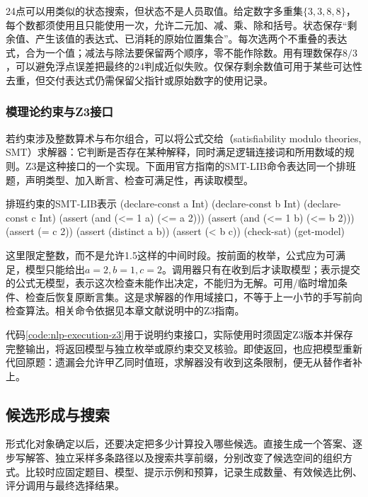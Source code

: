 24点可以用类似的状态搜索，但状态不是人员取值。给定数字多重集$\{3,3,8,8\}$，每个数都须使用且只能使用一次，允许二元加、减、乘、除和括号。状态保存“剩余值、产生该值的表达式、已消耗的原始位置集合”。每次选两个不重叠的表达式，合为一个值；减法与除法要保留两个顺序，零不能作除数。用有理数保存$8/3$，可以避免浮点误差把最终的24判成近似失败。仅保存剩余数值可用于某些可达性去重，但交付表达式仍需保留父指针或原始数字的使用记录。

\subsubsection{模理论约束与Z3接口}
\label{sec:nlp-execution-z3}

若约束涉及整数算术与布尔组合，可以将公式交给（satisfiability modulo theories, SMT）求解器：它判断是否存在某种解释，同时满足逻辑连接词和所用数域的规则。Z3是这种接口的一个实现。下面用官方指南的SMT-LIB命令表达同一个排班题，声明类型、加入断言、检查可满足性，再读取模型。

\begin{codeblock}[label={code:nlp-execution-z3}]{排班约束的SMT-LIB表示}
(declare-const a Int)
(declare-const b Int)
(declare-const c Int)
(assert (and (<= 1 a) (<= a 2)))
(assert (and (<= 1 b) (<= b 2)))
(assert (= c 2))
(assert (distinct a b))
(assert (< b c))
(check-sat)
(get-model)
\end{codeblock}

这里限定整数，而不是允许1.5这样的中间时段。按前面的枚举，公式应为可满足，模型只能给出$a=2,b=1,c=2$。调用器只有在收到后才读取模型；表示提交的公式无模型，表示这次检查未能作出决定，不能归为无解。可用/临时增加条件、检查后恢复原断言集。这是求解器的作用域接口，不等于上一小节的手写前向检查算法。相关命令依据见本章文献说明中的Z3指南。

代码\ref{code:nlp-execution-z3}用于说明约束接口，实际使用时须固定Z3版本并保存完整输出，将返回模型与独立枚举或原约束交叉核验。即使返回，也应把模型重新代回原题：遗漏会允许甲乙同时值班，求解器没有收到这条限制，便无从替作者补上。

\subsection{候选形成与搜索}
\label{sec:nlp-execution-candidates}

形式化对象确定以后，还要决定把多少计算投入哪些候选。直接生成一个答案、逐步写解答、独立采样多条路径以及搜索共享前缀，分别改变了候选空间的组织方式。比较时应固定题目、模型、提示示例和预算，记录生成数量、有效候选比例、评分调用与最终选择结果。

